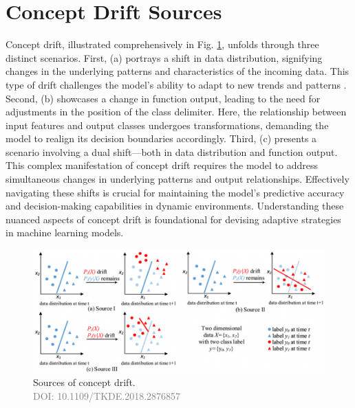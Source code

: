 \section{Concept Drift Sources}
\label{sec:background_concept_drift_sources}
Concept drift, illustrated comprehensively in Fig. \ref{fig:concept-drift-sources}, unfolds through three distinct scenarios. First, (a) portrays a shift in data distribution, signifying changes in the underlying patterns and characteristics of the incoming data. This type of drift challenges the model's ability to adapt to new trends and patterns \cite{lu2016concept} \cite{gama2014survey} \cite{losing2016knn} \cite{storkey2008training}.
Second, (b) showcases a change in function output, leading to the need for adjustments in the position of the class delimiter. Here, the relationship between input features and output classes undergoes transformations, demanding the model to realign its decision boundaries accordingly.
 Third, (c) presents a scenario involving a dual shift—both in data distribution and function output. This complex manifestation of concept drift requires the model to address simultaneous changes in underlying patterns and output relationships. Effectively navigating these shifts is crucial for maintaining the model's predictive accuracy and decision-making capabilities in dynamic environments. Understanding these nuanced aspects of concept drift is foundational for devising adaptive strategies in machine learning models.
 
\begin{figure}[!ht]
    \centering
    \includegraphics[width=1.0\textwidth]{2_Background/figures/concept_drift_sources.png}
    \caption{Sources of concept drift. \\ \textcolor{gray}{\fontsize{10}{0}\selectfont DOI: 10.1109/TKDE.2018.2876857}}
    \label{fig:concept-drift-sources}
\end{figure}

